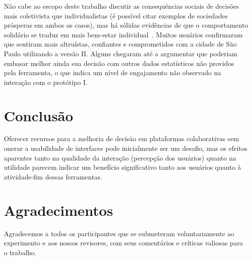 \documentclass{sigchi}
\begin{document}
Não cabe ao escopo deste trabalho discutir as consequências sociais de decisões mais coletivista que individualistas (é possível citar exemplos de sociedades prósperas em ambos os casos), mas há sólidas evidências de que o comportamento solidário se traduz em mais bem-estar individual~\cite{thoits:2001}. Muitos usuários confirmaram que sentiram mais altruístas, confiantes e comprometidos com a cidade de São Paulo utilizando a versão II. Alguns chegaram até a argumentar que poderiam embasar melhor ainda sua decisão com outros dados estatísticos não providos pela ferramenta, o que indica um nível de engajamento não observado na interação com o protótipo I.


%


\section{Conclusão}
Oferecer recursos para a melhoria de decisão em plataformas colaborativas sem onerar a usabilidade de interfaces pode inicialmente ser um desafio, mas os efeitos aparentes tanto na qualidade da interação (percepção dos usuários) quanto na utilidade parecem indicar um benefício significativo tanto aos usuários quanto à atividade-fim dessas ferramentas.


\section{Agradecimentos}

Agradecemos a todos os participantes que se submeteram voluntariamente ao experimento e aos nossos revisores, com seus comentários e críticas valiosas para o trabalho.


\balance{}


\balance{}



\end{document}
